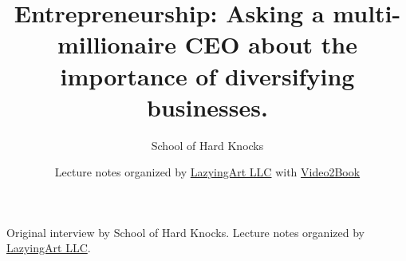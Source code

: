 \documentclass[11pt,oneside]{book}
\begin{document}
\frontmatter
\title{Entrepreneurship: Asking a multi-millionaire CEO about the importance of diversifying businesses.}
\author{School of Hard Knocks}
\date{Lecture notes organized by \href{https://lazying.art}{LazyingArt LLC} with \href{https://github.com/lachlanchen/Video2Book}{Video2Book}}
\maketitle
\begin{center}
\small Original interview by School of Hard Knocks. Lecture notes organized by \href{https://lazying.art}{LazyingArt LLC}.
\end{center}
\clearpage
\mainmatter

\end{document}
